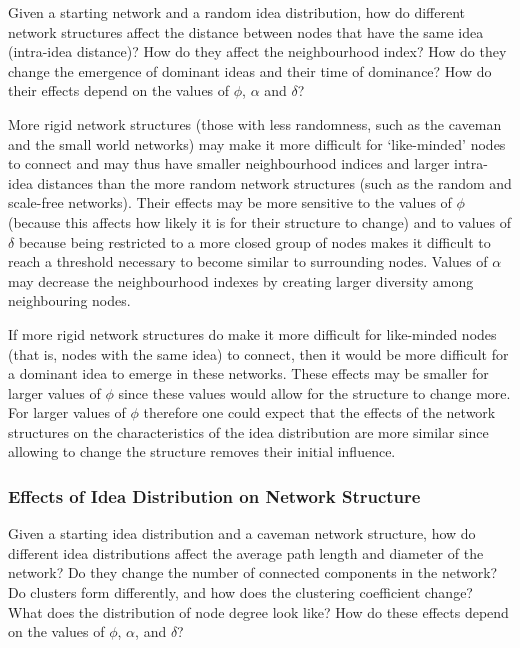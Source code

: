 Given a starting network and a random idea distribution, how do different network structures affect the distance between nodes that have the same idea (intra-idea distance)? How do they affect the neighbourhood index? How do they change the emergence of dominant ideas and their time of dominance? How do their effects depend on the values of $\phi$, $\alpha$ and $\delta$?


More rigid network structures (those with less randomness, such as the caveman and the small world networks) may make it more difficult for `like-minded' nodes to connect and may thus have smaller neighbourhood indices and larger intra-idea distances than the more random network structures (such as the random and scale-free networks). Their effects may be more sensitive to the values of $\phi$ (because this affects how likely it is for their structure to change) and to values of $\delta$ because being restricted to a more closed group of nodes makes it difficult to reach a threshold necessary to become similar to surrounding nodes. Values of $\alpha$ may decrease the neighbourhood indexes by creating larger diversity among neighbouring nodes.

If more rigid network structures do make it more difficult for like-minded nodes (that is, nodes with the same idea) to connect, then it would be more difficult for a dominant idea to emerge in these networks. These effects may be smaller for larger values of $\phi$ since these values would allow for the structure to change more. For larger values of $\phi$ therefore one could expect that the effects of the network structures on the characteristics of the idea distribution are more similar since allowing to change the structure removes their initial influence.


\subsubsection{Effects of Idea Distribution on Network Structure}

Given a starting idea distribution and a caveman network structure, how do different idea distributions affect the average path length and diameter of the network? Do they change the number of connected components in the network? Do clusters form differently, and how does the clustering coefficient change? What does the distribution of node degree look like? How do these effects depend on the values of $\phi$, $\alpha$, and $\delta$?



